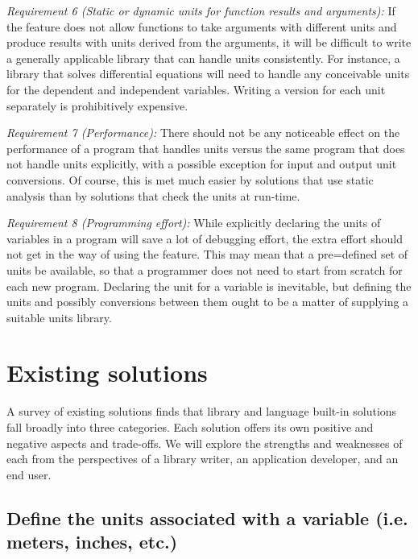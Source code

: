 \documentclass{article}
\begin{document}
\vspace{\baselineskip}
\noindent \emph{Requirement 6 (Static or dynamic units for function results and arguments):}
If the feature does not allow functions to take arguments with different units and produce results with units derived
from the arguments, it will be difficult to write a generally applicable library that can handle units consistently.
For instance, a library that solves differential equations will need to handle any conceivable units for the
dependent and independent variables. Writing a version for each unit separately is prohibitively expensive.

\vspace{\baselineskip}
\noindent \emph{Requirement 7 (Performance):}
There should not be any noticeable effect on the performance of a program that handles units versus the same program
that does not handle units explicitly, with a possible exception for input and output unit conversions. Of course, this
is met much easier by solutions that use static analysis than by solutions that check the units at run-time.

\vspace{\baselineskip}
\noindent \emph{Requirement 8 (Programming effort):}
While explicitly declaring the units of variables in a program will save a lot of debugging effort, the extra effort
should not get in the way of using the feature. This may mean that a pre=defined set of units be available, so that
a programmer does not need to start from scratch for each new program. Declaring the unit for a variable is inevitable,
but defining the units and possibly conversions between them ought to be a matter of supplying a suitable units library.


\section{Existing solutions}
\label{ExistingSolutions}

A survey of existing solutions finds that library and language built-in solutions fall broadly into three categories.
Each solution offers its own positive and negative aspects and trade-offs.
We will explore the strengths and weaknesses of each from the perspectives of a library writer, an application developer, and an end user.

\subsection{Define the units associated with a variable (i.e. meters, inches, etc.)}
\label{static-units}
\end{document}
